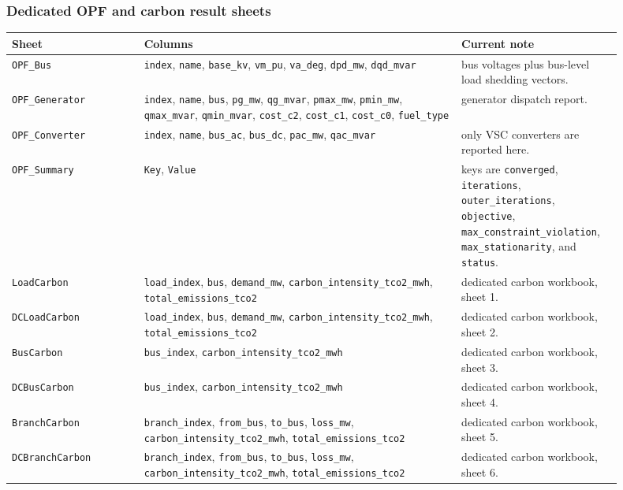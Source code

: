 \subsubsection*{Dedicated OPF and carbon result sheets}

\begin{longtable}{L{0.20\linewidth}L{0.48\linewidth}L{0.22\linewidth}}
\toprule
Sheet & Columns & Current note \\
\midrule
\endhead
\texttt{OPF\_Bus} & \texttt{index}, \texttt{name}, \texttt{base\_kv}, \texttt{vm\_pu}, \texttt{va\_deg}, \texttt{dpd\_mw}, \texttt{dqd\_mvar} & bus voltages plus bus-level load shedding vectors. \\
\texttt{OPF\_Generator} & \texttt{index}, \texttt{name}, \texttt{bus}, \texttt{pg\_mw}, \texttt{qg\_mvar}, \texttt{pmax\_mw}, \texttt{pmin\_mw}, \texttt{qmax\_mvar}, \texttt{qmin\_mvar}, \texttt{cost\_c2}, \texttt{cost\_c1}, \texttt{cost\_c0}, \texttt{fuel\_type} & generator dispatch report. \\
\texttt{OPF\_Converter} & \texttt{index}, \texttt{name}, \texttt{bus\_ac}, \texttt{bus\_dc}, \texttt{pac\_mw}, \texttt{qac\_mvar} & only VSC converters are reported here. \\
\texttt{OPF\_Summary} & \texttt{Key}, \texttt{Value} & keys are \texttt{converged}, \texttt{iterations}, \texttt{outer\_iterations}, \texttt{objective}, \texttt{max\_constraint\_violation}, \texttt{max\_stationarity}, and \texttt{status}. \\
\texttt{LoadCarbon} & \texttt{load\_index}, \texttt{bus}, \texttt{demand\_mw}, \texttt{carbon\_intensity\_tco2\_mwh}, \texttt{total\_emissions\_tco2} & dedicated carbon workbook, sheet 1. \\
\texttt{DCLoadCarbon} & \texttt{load\_index}, \texttt{bus}, \texttt{demand\_mw}, \texttt{carbon\_intensity\_tco2\_mwh}, \texttt{total\_emissions\_tco2} & dedicated carbon workbook, sheet 2. \\
\texttt{BusCarbon} & \texttt{bus\_index}, \texttt{carbon\_intensity\_tco2\_mwh} & dedicated carbon workbook, sheet 3. \\
\texttt{DCBusCarbon} & \texttt{bus\_index}, \texttt{carbon\_intensity\_tco2\_mwh} & dedicated carbon workbook, sheet 4. \\
\texttt{BranchCarbon} & \texttt{branch\_index}, \texttt{from\_bus}, \texttt{to\_bus}, \texttt{loss\_mw}, \texttt{carbon\_intensity\_tco2\_mwh}, \texttt{total\_emissions\_tco2} & dedicated carbon workbook, sheet 5. \\
\texttt{DCBranchCarbon} & \texttt{branch\_index}, \texttt{from\_bus}, \texttt{to\_bus}, \texttt{loss\_mw}, \texttt{carbon\_intensity\_tco2\_mwh}, \texttt{total\_emissions\_tco2} & dedicated carbon workbook, sheet 6. \\

\end{longtable}

